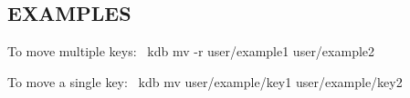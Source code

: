 \subsection*{E\+X\+A\+M\+P\+L\+ES}

To move multiple keys\+:~\newline
 {\ttfamily kdb mv -\/r user/example1 user/example2}

To move a single key\+:~\newline
 {\ttfamily kdb mv user/example/key1 user/example/key2} 